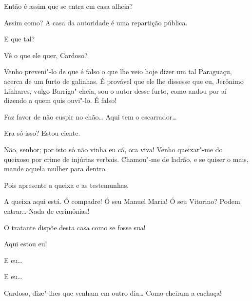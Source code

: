 \begin{linenumbers}


 Então é assim que se entra em casa alheia?

  Assim como? A casa da autoridade é uma
repartição pública. 

 E que tal?

 Vê o que ele quer, Cardoso?

 Venho preveni"-lo de que é falso o que lhe veio hoje dizer um
tal Paraguaçu, acerca de um furto de
galinhas. É provável que ele lhe dissesse que eu, Jerônimo Linhares,
vulgo Barriga"-cheia, sou o autor desse
furto, como andou por aí dizendo a quem quis ouvi"-lo. É falso!

  Faz favor de
não cuspir no chão\ldots{} Aqui tem o escarrador\ldots{}

 Era só isso? Estou ciente.

 Não, senhor; por isto só não vinha eu cá, ora viva! Venho
queixar"-me do queixoso por crime de
injúrias verbais. Chamou"-me de ladrão, e se quiser o mais, mande aquela
mulher para dentro. 

 Pois apresente a queixa e as testemunhas.

 A queixa aqui está.  Ó compadre! Ó seu Manuel Maria! Ó seu Vitorino? Podem
entrar\ldots{} Nada de cerimônias!

  O tratante dispõe desta casa como se
fosse sua!



  Aqui estou eu!

  E eu\ldots{}

  E eu\ldots{}

 Cardoso, dize"-lhes que venham em outro dia\ldots{}  Como cheiram a cachaça!


\end{linenumbers}
